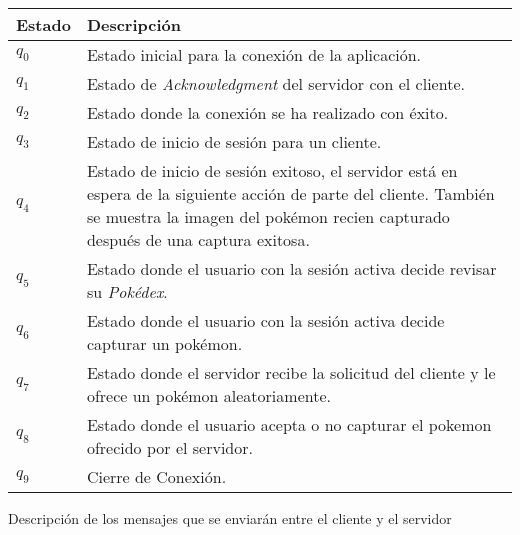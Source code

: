 \documentclass[12pt]{article}
\begin{document}
\begin{center}
\begin{tabular}{|l|p{9cm}|}
  \hline
  Estado & Descripción \\
  \hline
  $q_0$ & Estado inicial para la conexión de la aplicación. \\ \hline
  $q_1$ & Estado de \textit{Acknowledgment} del servidor con el cliente. \\ \hline
  $q_2$ & Estado donde la conexión se ha realizado con éxito. \\ \hline
  $q_3$ & Estado de inicio de sesión para un cliente. \\ \hline
  $q_4$ & Estado de inicio de sesión exitoso, el servidor está en espera de la siguiente acción de parte del cliente. También se muestra la imagen del pokémon recien capturado después de una captura exitosa. \\ \hline
  $q_5$ & Estado donde el usuario con la sesión activa decide revisar su \textit{Pokédex}. \\ \hline
  $q_6$ & Estado donde el usuario con la sesión activa decide capturar un pokémon.\\ \hline
  $q_7$ & Estado donde el servidor recibe la solicitud del cliente y le ofrece un pokémon aleatoriamente.\\ \hline
  $q_8$ & Estado donde el usuario acepta o no capturar el pokemon ofrecido por el servidor.\\ \hline
  $q_9$ & Cierre de Conexión. \\
  \hline
\end{tabular}
\end{center}
\newpage

Descripción de los mensajes que se enviarán entre el cliente y el servidor
\end{document}

